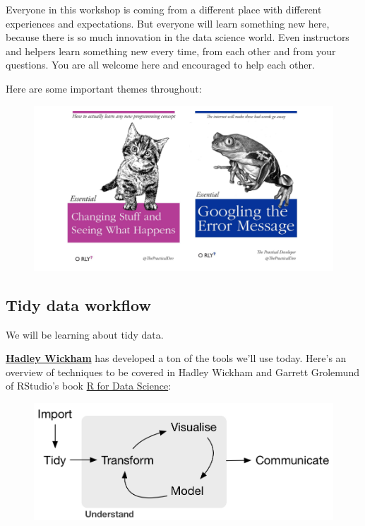 \documentclass[]{book}
\theoremstyle{definition}
\theoremstyle{definition}
\theoremstyle{definition}
\theoremstyle{remark}
\begin{document}
Everyone in this workshop is coming from a different place with
different experiences and expectations. But everyone will learn
something new here, because there is so much innovation in the data
science world. Even instructors and helpers learn something new every
time, from each other and from your questions. You are all welcome here
and encouraged to help each other.

Here are some important themes throughout:

\begin{figure}
\centering
\includegraphics{img/practical_dev_both.png}
\caption{}
\end{figure}

\subsection{Tidy data workflow}\label{tidy-data-workflow}

We will be learning about tidy data.

\href{http://hadley.nz/}{\textbf{Hadley Wickham}} has developed a ton of
the tools we'll use today. Here's an overview of techniques to be
covered in Hadley Wickham and Garrett Grolemund of RStudio's book
\href{http://r4ds.had.co.nz/}{R for Data Science}:

\begin{figure}
\centering
\includegraphics{img/r4ds_data-science.png}
\caption{}
\end{figure}
\end{document}
